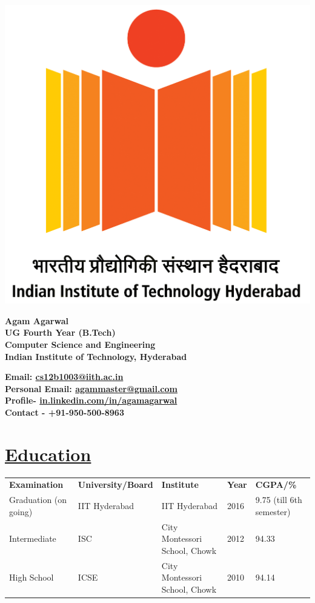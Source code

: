 \documentclass[9pt]{extarticle}
\newcommand{\heading}[1]{
\section*{\color{red}\underline{#1}}
}
\begin{document}
\begin{table}[ht]
\begin{minipage}{0.2\linewidth}
\includegraphics[width=0.8\linewidth]{iith}
\end{minipage}
\begin{minipage}{0.4\linewidth}
\begin{flushleft}
\textbf{Agam Agarwal \\
UG Fourth Year (B.Tech) \\
Computer Science and Engineering \\
Indian Institute of Technology, Hyderabad}
\end{flushleft}
\end{minipage}
\hspace{0.5cm}
\begin{minipage}{0.4\linewidth}
\begin{flushleft}
\textbf{Email: \href{mailto:cs12b1003@iith.ac.in}{cs12b1003@iith.ac.in} \\
Personal Email: \href{mailto:agammaster@gmail.com}{agammaster@gmail.com} \\
Profile- \url{in.linkedin.com/in/agamagarwal} \\
Contact - +91-950-500-8963}
\end{flushleft}
\end{minipage}
\end{table}

\heading{Education}

\begin{tabular}{lllll}
\textbf{Examination} & \textbf{University/Board} & \textbf{Institute} & \textbf{Year} & \textbf{CGPA/\%} \\
Graduation (on going) & IIT Hyderabad & IIT Hyderabad & 2016 & 9.75 (till 6th semester) \\
Intermediate & ISC & City Montessori School, Chowk & 2012 & 94.33 \\
High School & ICSE & City Montessori School, Chowk & 2010 & 94.14
\end{tabular}
\end{document}
